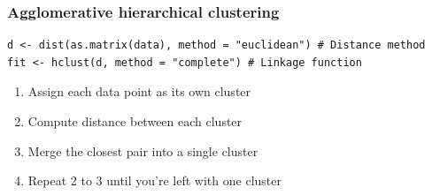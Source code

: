 \documentclass[pdf]{beamer}
\begin{document}
\begin{frame}[fragile]
\frametitle{Agglomerative hierarchical clustering}
\begin{lstlisting}[style=RCode]
d <- dist(as.matrix(data), method = "euclidean") # Distance method
fit <- hclust(d, method = "complete") # Linkage function
\end{lstlisting}
\begin{enumerate}\addtolength{\itemsep}{0.5\baselineskip}
	\item<2-> Assign each data point as its own cluster
	\item<3-> Compute distance between each cluster
	\item<4-> Merge the closest pair into a single cluster
	\item<5-> Repeat 2 to 3 until you're left with one cluster
\end{enumerate}
\vfill
{}
\end{frame}
\end{document}
